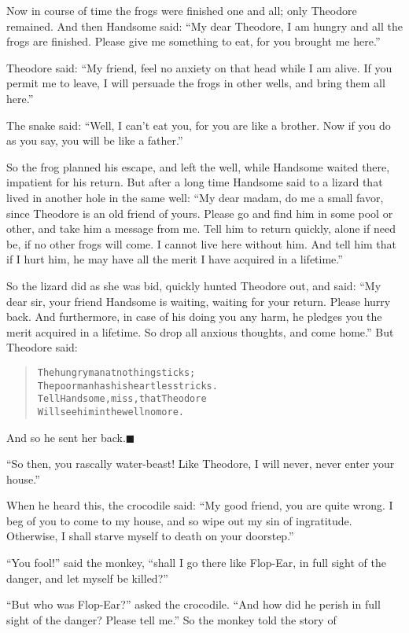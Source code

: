 \documentclass[article, twoside, 14pt]{memoir}
\newcommand{\qed}{\hfill \ensuremath{\blacksquare}}
\renewenvironment{verbatim}{%
\begin{quote}%
\vskip -10pt%
\begin{alltt}\normalfont\large}{\end{alltt}%
\end{quote}%
\vskip -10pt
} %
\begin{document}
Now in course of time the frogs were finished one and all; only
Theodore remained. And then Handsome said:
``My dear Theodore, I am hungry and all the frogs are finished. Please give me something to eat, for you brought me here.''

Theodore said:
``My friend, feel no anxiety on that head while I am alive. If you permit me to leave, I will persuade the frogs in other wells, and bring them all here.''

The snake said:
``Well, I can't eat you, for you are like a brother. Now if you do as you say, you will be like a father.''

So the frog planned his escape, and left the well, while Handsome
waited there, impatient for his return. But after a long time
Handsome said to a lizard that lived in another hole in the same
well:
``My dear madam, do me a small favor, since Theodore is an old friend of yours. Please go and find him in some pool or other, and take him a message from me. Tell him to return quickly, alone if need be, if no other frogs will come. I cannot live here without him. And tell him that if I hurt him, he may have all the merit I have acquired in a lifetime.''

So the lizard did as she was bid, quickly hunted Theodore out, and
said:
``My dear sir, your friend Handsome is waiting, waiting for your return. Please hurry back. And furthermore, in case of his doing you any harm, he pledges you the merit acquired in a lifetime. So drop all anxious thoughts, and come home.''
But Theodore said:

\begin{verbatim}
The hungry man at nothing sticks;
The poor man has his heartless tricks.
Tell Handsome, miss, that Theodore
Will see him in the well no more.
\end{verbatim}
And so he sent her back.\hyperref[s67]{\qed}

``So then, you rascally water-beast! Like Theodore, I will never, never enter your house.''

When he heard this, the crocodile said:
``My good friend, you are quite wrong. I beg of you to come to my house, and so wipe out my sin of ingratitude. Otherwise, I shall starve myself to death on your doorstep.''

``You fool!'' said the monkey,
``shall I go there like Flop-Ear, in full sight of the danger, and let myself be killed?''

``But who was Flop-Ear?'' asked the crocodile.
``And how did he perish in full sight of the danger? Please tell me.''
So the monkey told the story of
\end{document}
